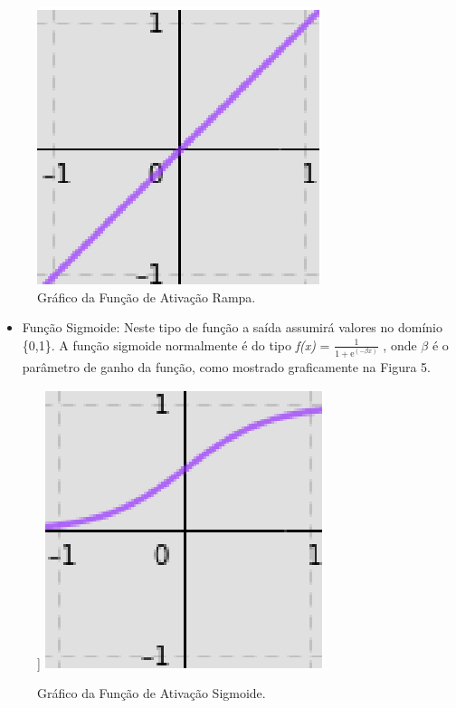             \begin{figure}[ht]
                \centering
                \label{fig04}
                    \includegraphics[keepaspectratio=true, scale=0.5]{editaveis/images/graficofxx.eps}
                \caption{Gráfico da Função de Ativação Rampa.}
            \end{figure}
    
    \begin{itemize}
        \item Função Sigmoide: Neste tipo de função a saída assumirá valores no domínio \{0,1\}. A função sigmoide normalmente é do tipo \textit{f(x)} = $\frac{1}{1+\mathrm{e}^{(-\beta \textit{x})}}$ , onde $\beta$ é o parâmetro de ganho da função, como mostrado graficamente na Figura 5.
    \end{itemize}
    
            \begin{figure}[ht]]
                \centering
                \label{fig05}
                    \includegraphics[keepaspectratio=true, scale=0.5]{editaveis/images/graficosigm.eps}
                \caption{Gráfico da Função de Ativação Sigmoide.}
            \end{figure}
    

